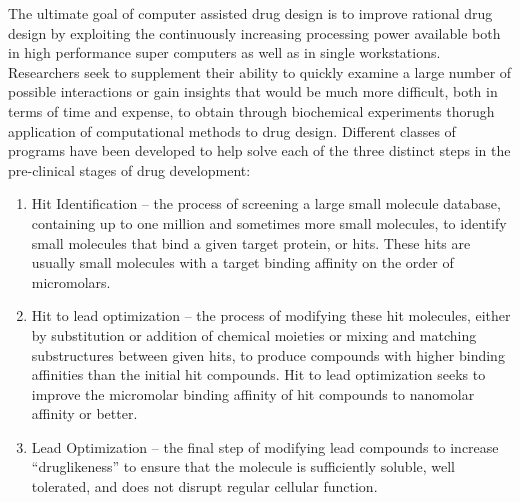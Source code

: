 The ultimate goal of computer assisted drug design is to improve rational drug design by exploiting the continuously increasing processing power available both in high performance super computers as well as in single workstations.
Researchers seek to supplement their ability to quickly examine a large number of possible interactions or gain insights that would be much more difficult, both in terms of time and expense, to obtain through biochemical experiments thorugh application of computational methods to drug design.
Different classes of programs have been developed to help solve each of the three distinct steps in the pre-clinical stages of drug development:
\begin{enumerate}
\item Hit Identification -- the process of screening a large small molecule database, containing up to one million and sometimes more small molecules, to identify small molecules that bind a given target protein, or hits.
These hits are usually small molecules with a target binding affinity on the order of micromolars.
\item Hit to lead optimization -- the process of modifying these hit molecules, either by substitution or addition of chemical moieties or mixing and matching substructures between given hits, to produce compounds with higher binding affinities than the initial hit compounds.
Hit to lead optimization seeks to improve the micromolar binding affinity of hit compounds to nanomolar affinity or better.
\item Lead Optimization -- the final step of modifying lead compounds to increase ``druglikeness'' to ensure that the molecule is sufficiently soluble, well tolerated, and does not disrupt regular cellular function.
\end{enumerate}


